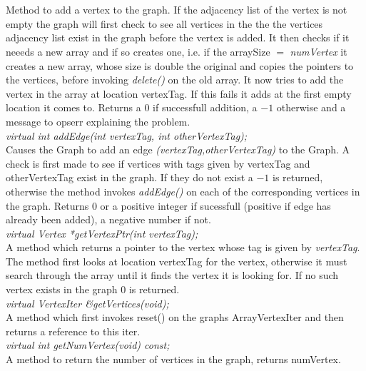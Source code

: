  \\
  \\
Method to add a vertex to the graph. If the adjacency list
of the vertex is not empty the graph will first check to see all
vertices in the the the vertices adjacency list exist in the graph
before the vertex is added. It then checks if it neeeds a new array
and if so creates one, i.e. if the \p arraySize $=$ {\em
numVertex} it creates a new array, whose size is double the original
and copies the pointers to the vertices, before invoking {\em
delete()} on the old array. It now tries to add the vertex in the
array at location \p vertexTag. If this fails it adds at the first
empty location it comes to. Returns a 0 if successfull addition, a
$-1$ otherwise and a message to opserr explaining the problem. \\ 

{\em virtual int addEdge(int vertexTag, int otherVertexTag); } \\
Causes the Graph to add an edge {\em (vertexTag,otherVertexTag)} to
the Graph. A check is first made to see if vertices with tags given by
\p vertexTag and \p otherVertexTag exist in the graph. If they
do not exist a $-1$ is returned, otherwise the method invokes {\em
addEdge()} on each of the corresponding vertices in the 
graph. Returns $0$ or a positive integer if sucessfull (positive if
edge has already been added), a negative number if not.\\ 


{\em virtual Vertex *getVertexPtr(int vertexTag);} \\
A method which returns a pointer to the vertex whose tag is given by {\em
vertexTag}. The method first looks at location \p vertexTag for the
vertex, otherwise it must search through the array until it finds the
vertex it is looking for. If no such vertex exists in the graph $0$ is
returned.\\ 

{\em virtual VertexIter \&getVertices(void);} \\
A method which first invokes reset() on the graphs ArrayVertexIter
and then returns a reference to this iter.\\

{\em virtual int getNumVertex(void) const;} \\
A method to return the number of vertices in the graph, returns numVertex. \\

